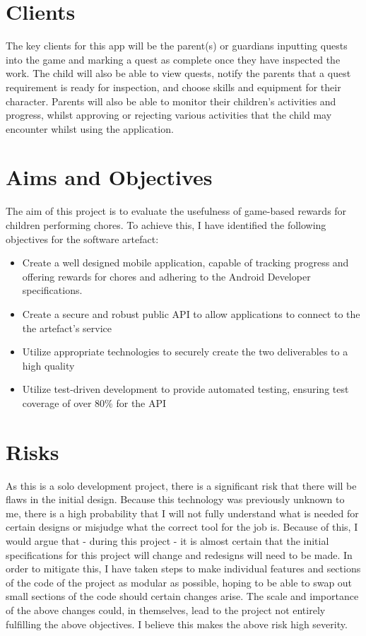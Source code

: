 \section{Clients}
The key clients for this app will be the parent(s) or guardians inputting quests into the game and marking a quest as complete once they have inspected the work. 
The child will also be able to view quests, notify the parents that a quest requirement is ready for inspection, and choose skills and equipment for their character.
Parents will also be able to monitor their children's activities and progress, whilst approving or rejecting various activities that the child may encounter whilst using the application. 

\section{Aims and Objectives}
The aim of this project is to evaluate the usefulness of game-based rewards for children performing chores. 
To achieve this, I have identified the following objectives for the software artefact:

\begin{itemize}
	\item Create a well designed mobile application, capable of tracking progress and offering rewards for chores and adhering to the Android Developer specifications.
	\item Create a secure and robust public API to allow applications to connect to the the artefact's service
	\item Utilize appropriate technologies to securely create the two deliverables to a high quality
	\item Utilize test-driven development to provide automated testing, ensuring test coverage of over 80\% for the API
\end{itemize}

\section{Risks}
As this is a solo development project, there is a significant risk that there will be flaws in the initial design. 
Because this technology was previously unknown to me, there is a high probability that I will not fully understand what is needed for certain designs or misjudge what the correct tool for the job is.
Because of this, I would argue that - during this project - it is almost certain that the initial specifications for this project will change and redesigns will need to be made.
In order to mitigate this, I have taken steps to make individual features and sections of the code of the project as modular as possible, hoping to be able to swap out small sections of the code should certain changes arise.
The scale and importance of the above changes could, in themselves, lead to the project not entirely fulfilling the above objectives. I believe this makes the above risk high severity.

